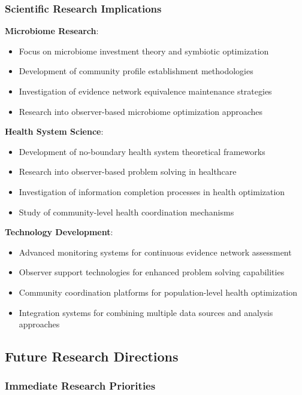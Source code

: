 \documentclass[12pt,a4paper]{article}
\begin{document}
\subsubsection{Scientific Research Implications}

\textbf{Microbiome Research}:
\begin{itemize}
\item Focus on microbiome investment theory and symbiotic optimization
\item Development of community profile establishment methodologies
\item Investigation of evidence network equivalence maintenance strategies
\item Research into observer-based microbiome optimization approaches
\end{itemize}

\textbf{Health System Science}:
\begin{itemize}
\item Development of no-boundary health system theoretical frameworks
\item Research into observer-based problem solving in healthcare
\item Investigation of information completion processes in health optimization
\item Study of community-level health coordination mechanisms
\end{itemize}

\textbf{Technology Development}:
\begin{itemize}
\item Advanced monitoring systems for continuous evidence network assessment
\item Observer support technologies for enhanced problem solving capabilities
\item Community coordination platforms for population-level health optimization
\item Integration systems for combining multiple data sources and analysis approaches
\end{itemize}

\subsection{Future Research Directions}

\subsubsection{Immediate Research Priorities}
\end{document}
